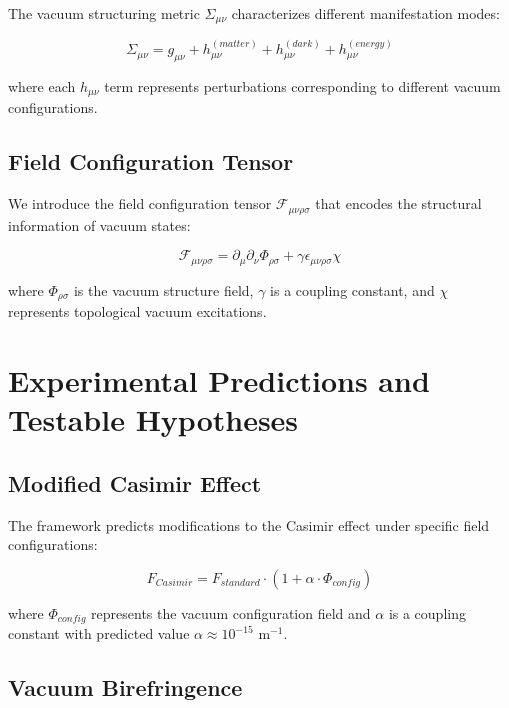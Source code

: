 \documentclass[12pt,a4paper]{article}
\begin{document}
The vacuum structuring metric $\Sigma_{\mu\nu}$ characterizes different manifestation modes:

\begin{equation}
\Sigma_{\mu\nu} = g_{\mu\nu} + h_{\mu\nu}^{(matter)} + h_{\mu\nu}^{(dark)} + h_{\mu\nu}^{(energy)}
\end{equation}

where each $h_{\mu\nu}$ term represents perturbations corresponding to different vacuum configurations.

\subsection{Field Configuration Tensor}

We introduce the field configuration tensor $\mathcal{F}_{\mu\nu\rho\sigma}$ that encodes the structural information of vacuum states:

\begin{equation}
\mathcal{F}_{\mu\nu\rho\sigma} = \partial_\mu \partial_\nu \Phi_{\rho\sigma} + \gamma \epsilon_{\mu\nu\rho\sigma} \chi
\end{equation}

where $\Phi_{\rho\sigma}$ is the vacuum structure field, $\gamma$ is a coupling constant, and $\chi$ represents topological vacuum excitations.

\section{Experimental Predictions and Testable Hypotheses}

\subsection{Modified Casimir Effect}

The framework predicts modifications to the Casimir effect under specific field configurations:

\begin{equation}
F_{Casimir} = F_{standard} \cdot \left(1 + \alpha \cdot \Phi_{config}\right)
\end{equation}

where $\Phi_{config}$ represents the vacuum configuration field and $\alpha$ is a coupling constant with predicted value $\alpha \approx 10^{-15}$ m$^{-1}$.

\subsection{Vacuum Birefringence}
\end{document}

